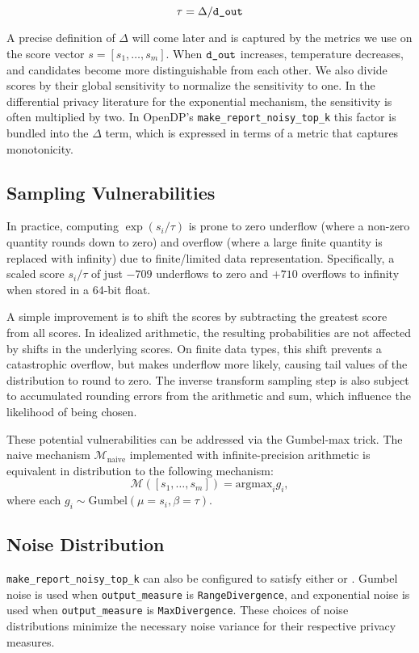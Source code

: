 \documentclass{article}
\begin{document}
\begin{equation} 
    \tau = \Delta / \texttt{d\_out}
\end{equation} 

A precise definition of $\Delta$ will come later and is captured by the metrics we use on the score vector $s = [s_1, \ldots, s_m]$.
When $\texttt{d\_out}$ increases, temperature decreases, and candidates become more distinguishable from each other. 
We also divide scores by their global sensitivity to normalize the sensitivity to one. 
In the differential privacy literature for the exponential mechanism, the sensitivity is often multiplied by two. 
In OpenDP's \texttt{make\_report\_noisy\_top\_k} this factor is bundled into the $\Delta$ term, which is expressed in terms of a metric that captures monotonicity. 
 
\subsection{Sampling Vulnerabilities} 
 
In practice, computing $\exp(s_i / \tau)$ is prone to 
zero underflow (where a non-zero quantity rounds down to zero) 
and overflow (where a large finite quantity is replaced with infinity) 
due to finite/limited data representation.  
Specifically, a scaled score $s_i / \tau$ of just $-709$ underflows to zero and $+710$ overflows to infinity when stored in a 64-bit float.  

A simple improvement is to shift the scores by subtracting the greatest score from all scores. 
In idealized arithmetic, the resulting probabilities are not affected by shifts in the underlying scores. 
On finite data types, this shift prevents a catastrophic overflow, but makes underflow more likely,  
causing tail values of the distribution to round to zero.  
The inverse transform sampling step is also subject to accumulated rounding errors from the arithmetic and sum,  
which influence the likelihood of being chosen. 

These potential vulnerabilities can be addressed via the Gumbel-max trick.
The naive mechanism $\mathcal{M}_\mathrm{naive}$ implemented with infinite-precision arithmetic
is equivalent in distribution to the following mechanism:
\begin{equation} 
    \mathcal{M}([s_1, \ldots, s_m]) = \mathrm{argmax}_i g_i,
\end{equation}
where each $g_i \sim \mathrm{Gumbel}(\mu = s_i, \beta = \tau)$.
 
\subsection{Noise Distribution} 
\texttt{make\_report\_noisy\_top\_k} can also be configured to satisfy 
either  or .
Gumbel noise is used when \texttt{output\_measure} is \texttt{RangeDivergence},
and exponential noise is used when \texttt{output\_measure} is \texttt{MaxDivergence}.
These choices of noise distributions minimize the necessary noise variance for their respective privacy measures.
\end{document}

